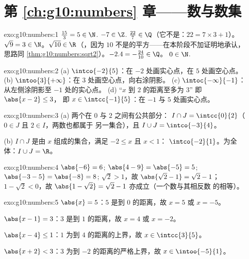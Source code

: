 \section*{第 \ref{ch:g10:numbers} 章——数与数集}

\begin{solution}{exo:g10:numbers:1}
$\frac{15}{3} = 5 \in \N$. \quad $-7 \in \Z$. \quad
$\frac{22}{7} \in \Q$（它不是：$22 = 7 \times 3 + 1$）。
\quad $\sqrt 9 = 3 \in \N$。\quad $\sqrt{10} \in \R$（，因为
$10$ 不是的平方——在本阶段不加证明地承认，思路同
\cref{thm:g10:numbers:sqrt2}）。\quad $-2.4 = -\frac{24}{10} \in \Q$。
\quad $0 \in \N$.
\end{solution}

\begin{solution}{exo:g10:numbers:2}
(a) $\intco{-2}{5}$：在 $-2$ 处画实心点，在 $5$ 处画空心点。
(b) $\intoo{3}{+\infty}$：在 $3$ 处画空心点，向右涂阴影。
(c) $\intoc{-\infty}{-1}$：从左侧涂阴影至
$-1$ 处的实心点。
(d) “$x$ 到 $2$ 的距离至多为 $3$” 即 $\abs{x - 2} \leq 3$，
即 $x \in \intcc{-1}{5}$：在 $-1$ 与 $5$ 处画实心点。
\end{solution}

\begin{solution}{exo:g10:numbers:3}
(a) 两个在 $0$ 与 $2$ 之间有公共部分：
$I \cap J = \intcc{0}{2}$（$0 \in J$ 且 $2 \in I$，两数也都属于
另一集合），且 $I \cup J = \intco{-3}{4}$。

(b) $I \cap J$ 是由 $x$ 组成的集合，满足 $-2 \leq x$ 且 $x < 1$：
$\intco{-2}{1}$。为全体：$I \cup J = \R$。
\end{solution}

\begin{solution}{exo:g10:numbers:4}
$\abs{-6} = 6$; \quad $\abs{4 - 9} = \abs{-5} = 5$; \quad
$\abs{-3 - 5} = \abs{-8} = 8$; \quad
$\sqrt 2 > 1$，故 $\abs{\sqrt2 - 1} = \sqrt2 - 1$；\quad
$1 - \sqrt2 < 0$，故 $\abs{1 - \sqrt2} = \sqrt2 - 1$ 亦成立（一个数与其相反数
的相等）。
\end{solution}

\begin{solution}{exo:g10:numbers:5}
$\abs{x} = 5$：$5$ 是到 $0$ 的距离，故 $x = 5$ 或 $x = -5$。

$\abs{x - 1} = 3$：$3$ 是到 $1$ 的距离，故 $x = 4$ 或 $x = -2$。

$\abs{x - 4} \leq 1$：$1$ 为到 $4$ 的距离的上界，故
$x \in \intcc{3}{5}$。

$\abs{x + 2} < 3$：$3$ 为到 $-2$ 的距离的严格上界，故
$x \in \intoo{-5}{1}$。
\end{solution}

